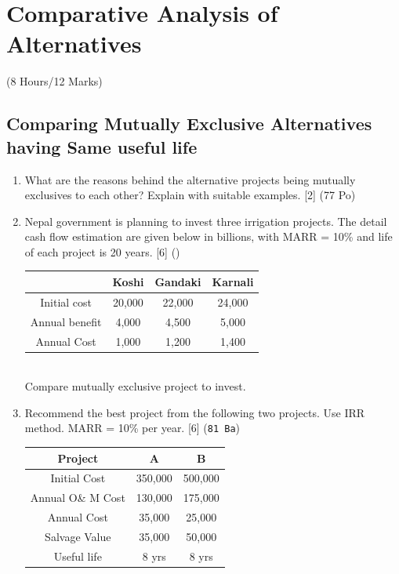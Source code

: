 \documentclass[12pt]{article}
\begin{document}
	\pagebreak
\section{Comparative Analysis of Alternatives}
	\begin{center}(8 Hours/12 Marks)\end{center}

	\subsection{Comparing Mutually Exclusive Alternatives having Same useful life}
		\begin{enumerate}
			\item What are the reasons behind the alternative projects being mutually exclusives to each other? Explain with suitable examples. \hfill [2] (77 Po)
			
			\item Nepal government is planning to invest three irrigation projects. The detail cash flow estimation are given below in billions, with MARR = 10\% and life of each project is 20 years. \hfill [6] ()
			\begin{tabular}{|c|c|c|c|}
				\hline
				& Koshi & Gandaki & Karnali \\ \hline
				Initial cost & 20,000 & 22,000 & 24,000 \\ \hline
				Annual benefit & 4,000 & 4,500 & 5,000 \\ \hline
				Annual Cost & 1,000 & 1,200 & 1,400 \\ \hline
			\end{tabular}\\
			Compare mutually exclusive project to invest.

			\item Recommend the best project from the following two projects. Use IRR method. MARR = 10\% per year. \hfill [6] (\texttt{81 Ba})\\
			\begin{tabular}{|c|c|c|}
				\hline
				Project & A & B \\ \hline
				Initial Cost & 350,000 & 500,000 \\ \hline
				Annual O\& M Cost & 130,000 & 175,000 \\ \hline
				Annual Cost & 35,000 & 25,000 \\ \hline
				Salvage Value & 35,000 & 50,000 \\ \hline
				Useful life & 8 yrs & 8 yrs \\ \hline
			\end{tabular}
			

\end{enumerate}
\end{document}
